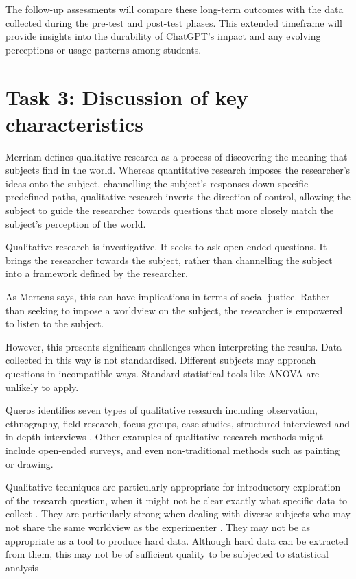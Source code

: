 \documentclass[12pt]{article}
\begin{document}
The follow-up assessments will compare these long-term outcomes with the data collected during the pre-test and post-test phases. This extended timeframe will provide insights into the durability of ChatGPT's impact and any evolving perceptions or usage patterns among students.


\section{Task 3: Discussion of key characteristics}


Merriam defines qualitative research as a process of discovering the meaning that subjects find in the world. Whereas quantitative research imposes the researcher's ideas onto the subject, channelling the subject's responses down specific predefined paths, qualitative research inverts the direction of control, allowing the subject to guide the researcher towards questions that more closely match the subject's perception of the world. \cite{merriam}

Qualitative research is investigative. It seeks to ask open-ended questions. It brings the researcher towards the subject, rather than channelling the subject into a framework defined by the researcher.

As Mertens says, this can have implications in terms of social justice. Rather than seeking to impose a worldview on the subject, the researcher is empowered to listen to the subject. \cite{mertens}

However, this presents significant challenges when interpreting the results. Data collected in this way is not standardised. Different subjects may approach questions in incompatible ways. Standard statistical tools like ANOVA are unlikely to apply.

Queros identifies seven types of qualitative research including observation, ethnography, field research, focus groups, case studies, structured interviewed and in depth interviews \cite{queros}. Other examples of qualitative research methods might include open-ended surveys, and even non-traditional methods such as painting or drawing. \cite{merriam}

Qualitative techniques are particularly appropriate for introductory exploration of the research question, when it might not be clear exactly what specific data to collect \cite{merriam}. They are particularly strong when dealing with diverse subjects who may not share the same worldview as the experimenter \cite{mertens}. They may not be as appropriate as a tool to produce hard data. Although hard data can be extracted from them, this may not be of sufficient quality to be subjected to statistical analysis \cite{allwood}
\end{document}

